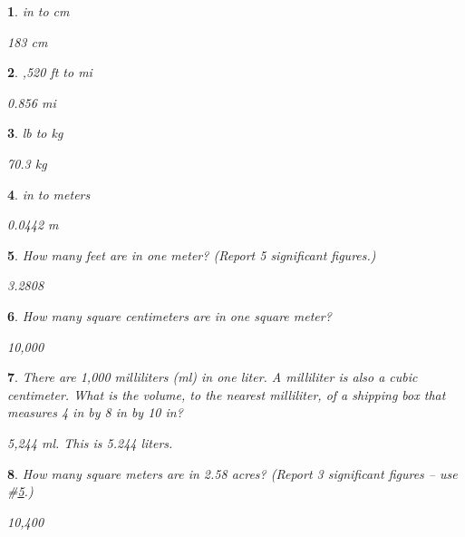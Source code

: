 \documentclass{amsbook}
\newtheorem{exc}{}
\newenvironment{ex}{\begin{exc}\normalfont}{\end{exc}}
\numberwithin{section}{chapter}
\numberwithin{equation}{chapter}
\begin{document}
\begin{multicols}{2}
	\begin{ex}
		72 in to cm
		\begin{sol}
			183 cm
		\end{sol}
	\end{ex}
	
	\begin{ex}
		4,520 ft to mi
		\begin{sol}
			0.856 mi
		\end{sol}
	\end{ex}
	
	\begin{ex}
		155 lb to kg
		\begin{sol}
			70.3 kg
		\end{sol}
	\end{ex}
	
\begin{ex}
	1.74 in to meters
	\begin{sol}
		0.0442 m
	\end{sol}
\end{ex}

\end{multicols}
\begin{ex} \label{ftm}
 How many feet are in one meter? (Report 5 significant figures.)
	\begin{sol}
		3.2808
	\end{sol}
\end{ex}

\begin{ex}
	How many square centimeters are in one square meter?
	\begin{sol}
		10,000
	\end{sol}
\end{ex}


\begin{ex} \label{boxml}
There are 1,000 milliliters (ml) in one liter. A milliliter is also a cubic centimeter. What is the volume, to the nearest milliliter, of a shipping box that measures 4 in by 8 in by 10 in?
	\begin{sol}
		5,244 ml. This is 5.244 liters.
	\end{sol}
\end{ex}

\begin{ex}
	How many square meters are in 2.58 acres? (Report 3 significant figures -- use \#\ref{ftm}.)
	\begin{sol}
		10,400
	\end{sol}
\end{ex}
\end{document}
